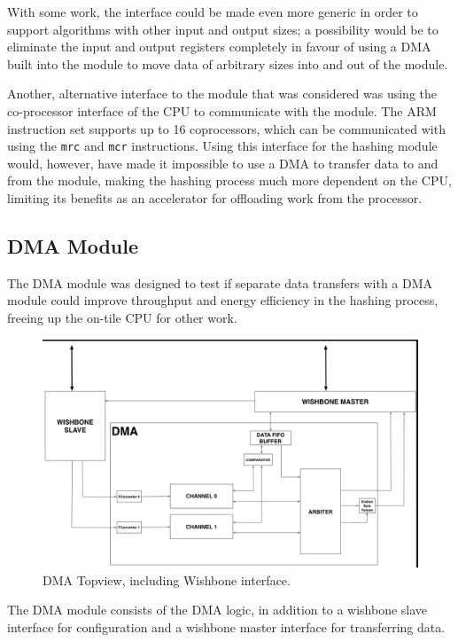 With some work, the interface could be made even more generic in order to support algorithms
with other input and output sizes; a possibility would be to eliminate the input and output
registers completely in favour of using a DMA built into the module to move data of arbitrary
sizes into and out of the module.

Another, alternative interface to the module that was considered was using the co-processor interface
of the CPU to communicate with the module. The ARM instruction set supports up to 16 coprocessors,
which can be communicated with using the \texttt{mrc} and \texttt{mcr} instructions. Using this
interface for the hashing module would, however, have made it impossible to use a DMA to transfer
data to and from the module, making the hashing process much more dependent on the CPU, limiting
its benefits as an accelerator for offloading work from the processor.


\subsection{DMA Module}

The DMA module was designed to test if separate data transfers with a DMA module could improve throughput and energy efficiency in the hashing process, freeing up the on-tile CPU for other work.

\begin{figure}[htb]
    \centering
    \includegraphics[width=1.0\textwidth]{Figures/DMA/DMATopview}
    \caption{DMA Topview, including Wishbone interface.}
    \label{fig:DMATop}
\end{figure}

The DMA module consists of the DMA logic, in addition to a wishbone slave interface for configuration
and a wishbone master interface for transferring data.

